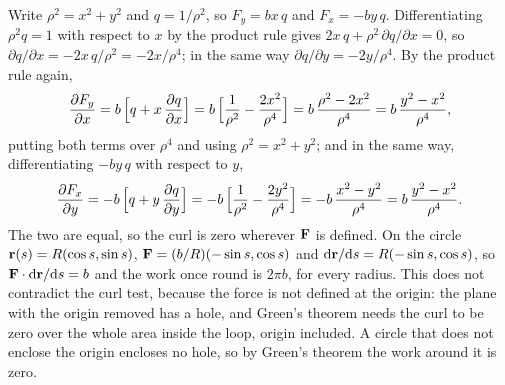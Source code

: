 Write $\rho^2 = x^2 + y^2$ and $q = 1/\rho^2$,
so $F_y = bx\,q$ and $F_x = -by\,q$. Differentiating $\rho^2 q = 1$ with
respect to $x$ by the product rule gives $2x\,q + \rho^2\,\partial
q/\partial x = 0$, so $\partial q/\partial x = -2x\,q/\rho^2 =
-2x/\rho^4$; in the same way $\partial q/\partial y = -2y/\rho^4$. By the
product rule again,
\begin{equation*}
   \frac{\partial F_y}{\partial x}
   = b\,\Bigl[q + x\,\frac{\partial q}{\partial x}\Bigr]
   = b\,\Bigl[\frac{1}{\rho^2} - \frac{2x^2}{\rho^4}\Bigr]
   = b\,\frac{\rho^2 - 2x^2}{\rho^4} = b\,\frac{y^2 - x^2}{\rho^4} ,
\end{equation*}
putting both terms over $\rho^4$ and using $\rho^2 = x^2 + y^2$; and in
the same way, differentiating $-by\,q$ with respect to $y$,
\begin{equation*}
   \frac{\partial F_x}{\partial y}
   = -b\,\Bigl[q + y\,\frac{\partial q}{\partial y}\Bigr]
   = -b\,\Bigl[\frac{1}{\rho^2} - \frac{2y^2}{\rho^4}\Bigr]
   = -b\,\frac{x^2 - y^2}{\rho^4} = b\,\frac{y^2 - x^2}{\rho^4} .
\end{equation*}
The two are equal, so the curl is zero wherever $\bm{\mathrm{F}}$ is defined. On the
circle $\bm{\mathrm{r}}(s) = R(\cos s, \sin s)$, $\bm{\mathrm{F}} = (b/R)(-\sin s, \cos s)$
and $\mathrm{d}\bm{\mathrm{r}}/\mathrm{d} s = R(-\sin s, \cos s)$, so $\bm{\mathrm{F}}\cdot\mathrm{d}\bm{\mathrm{r}}/\mathrm{d}
s = b$ and the work once round is $2\pi b$, for every radius. This does
not contradict the curl test, because the force is not defined at the
origin: the plane with the origin removed has a hole, and Green's theorem
needs the curl to be zero over the whole area inside the loop, origin
included. A circle that does not enclose the origin encloses no hole, so
by Green's theorem the work around it is zero.

